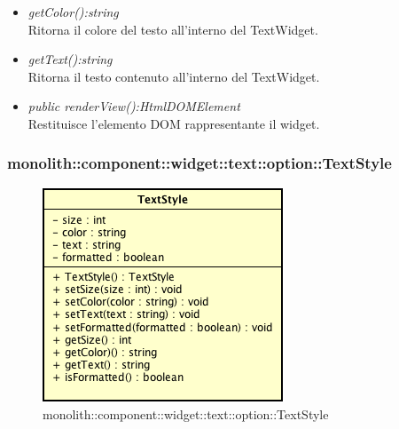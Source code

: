 \begin{itemize}
\begin{itemize}
\begin{itemize}
		\end{itemize} 
	\item \textit{getColor():string}\\
	Ritorna il colore del testo all'interno del TextWidget.
	\item \textit{getText():string}\\
	Ritorna il testo contenuto all'interno del TextWidget.
	\item \textit{public renderView():HtmlDOMElement}\\
	Restituisce l'elemento DOM rappresentante il widget.
	\end{itemize}
\end{itemize}

\subsubsection{monolith::component::widget::text::option::TextStyle}

\label{monolith::component::widget::text::option::TextStyle}
\begin{figure}[H]
	\centering
	\includegraphics[scale=0.5]{Sezioni/SottosezioniST/img/TextStyle.png}
	\caption{monolith::component::widget::text::option::TextStyle}
\end{figure}

